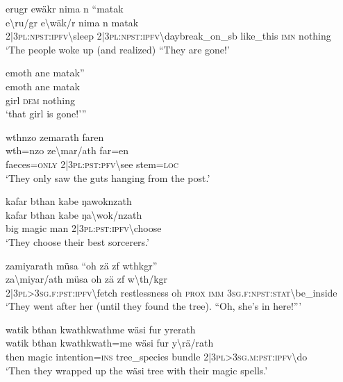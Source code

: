 \ea\label{ex:6:a1304}
erugr ewäkr nima n ``matak\\
\gll e{\textbackslash}ru/gr	e{\textbackslash}wäk/r	nima	n	matak\\
     2|3\textsc{pl}:\textsc{npst}:\textsc{ipfv}{\textbackslash}sleep	2|3\textsc{pl}:\textsc{npst}:\textsc{ipfv}{\textbackslash}daybreak\_on\_sb	like\_this	\textsc{imn}	nothing\\
\glt `The people woke up (and realized) ``They are gone!'
\z

\ea\label{ex:6:a1305}
emoth ane matak''\\
\gll emoth	ane	matak\\
     girl	\textsc{dem}	nothing\\
\glt `that girl is gone!'''
\z

\ea\label{ex:6:a1306}
wthnzo zemarath faren\\
\gll wth=nzo	ze{\textbackslash}mar/ath	far=en\\
     faeces=\textsc{only}	2|3\textsc{pl}:\textsc{pst}:\textsc{pfv}{\textbackslash}see	stem=\textsc{loc}\\
\glt `They only saw the guts hanging from the post.'
\z

\ea\label{ex:6:a1307}
kafar bthan kabe ŋawoknzath\\
\gll kafar	bthan	kabe	ŋa{\textbackslash}wok/nzath\\
     big	magic	man	2|3\textsc{pl}:\textsc{pst}:\textsc{ipfv}{\textbackslash}choose\\
\glt `They choose their best sorcerers.'
\z

\ea\label{ex:6:a1309}
zamiyarath müsa ``oh zä zf wthkgr''\\
\gll za{\textbackslash}miyar/ath	müsa	oh	zä	zf	w{\textbackslash}th/kgr\\
     2|3\textsc{pl}>3\textsc{sg}.\textsc{f}:\textsc{pst}:\textsc{ipfv}{\textbackslash}fetch	restlessness	oh	\textsc{prox}	\textsc{imm}	3\textsc{sg}.\textsc{f}:\textsc{npst}:\textsc{stat}{\textbackslash}be\_inside\\
\glt `They went after her (until they found the tree). ``Oh, she's in here!'''
\z

\ea\label{ex:6:a1310}
watik bthan kwathkwathme wäsi fur yrerath\\
\gll watik	bthan	kwathkwath=me	wäsi	fur	y{\textbackslash}rä/rath\\
     then	magic	intention=\textsc{ins}	tree\_species	bundle	2|3\textsc{pl}>3\textsc{sg}.\textsc{m}:\textsc{pst}:\textsc{ipfv}{\textbackslash}do\\
\glt `Then they wrapped up the wäsi tree with their magic spells.'
\z

